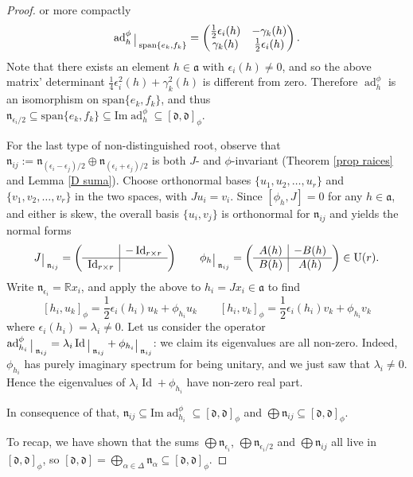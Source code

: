 \documentclass[12pt, twoside]{amsart}
\def\d{\mathfrak{d}}
\def\n{\mathfrak{n}}
\def\a{\mathfrak{a}}
\def\ad{\operatorname{ad}}
\DeclareMathOperator{\Id}{\operatorname{Id}}
\DeclareMathOperator{\U}{\operatorname{U}}
\newcommand{\restr}{\raisebox{-.2em}{$\!\big\arrowvert$}}
\theoremstyle{definition}
\begin{document}
\begin{proof}
or more compactly 
\begin{equation*}
    \ad^{\phi}_{h}\restr_{\text{span}\{e_k, f_k\}}= \begin{pmatrix}
        \frac{1}{2}\epsilon_{i}(h) & -\gamma_{k}(h) \\
        \gamma_{k}(h) & \frac{1}{2}\epsilon_{i}(h)
    \end{pmatrix}.
\end{equation*}
Note that there exists an element $h \in \a$ with $\epsilon_{i}(h) \neq 0$, and so the above matrix' determinant $\frac{1}{4}\epsilon_{i}^{2}(h)+\gamma_{k}^{2}(h)$ is different from zero. 
Therefore $\ad_{h}^{\phi}$ is an  isomorphism on $ \text{span} \{e_k, f_k\}$,  and thus $\n_{\epsilon_{i}/2}\subseteq \text{span}\{e_k, f_k\} \subseteq \text{Im} \ad_{h}^{\phi} \subseteq [\d, \d]_{\phi}$. \par
\quad For the last type of non-distinguished root, observe that $\n_{ij}:=\n_{(\epsilon_{i}-\epsilon_{j})/2}\oplus \n_{(\epsilon_{i}+\epsilon_{j})/2}$ is both $J$- and $\phi$-invariant (Theorem \ref{prop raices} and Lemma  \ref{D suma}). Choose orthonormal bases 
 $\{ u_1, u_2, \ldots,  u_r\}$ and $\{v_1,v_2,\ldots, v_r\}$ in the two spaces, with $Ju_i=v_i$. Since $[\phi_h, J]=0$ for any $h\in \a$, and either is skew, the overall basis  $\{u_i, v_j \}$ is orthonormal for $\n_{ij}$ and yields the normal forms
\begin{equation*}
J\restr_{\n_{ij}}=
\left(\begin{array}{c|c}
      & -\operatorname{Id}_{r\times r}\\ \hline
     \operatorname{Id}_{r \times r}&  
\end{array} \right)
\qquad 
\phi_h \restr_{\n_{ij}}=
\left( \begin{array}{c|c}
      A(h)& -B(h)\\ \hline
    B(h) &  A(h)
\end{array} \right)\in\U(r).
\end{equation*}
Write $\n_{\epsilon_i}=\mathbb{R}x_i$, and apply the above to $h_i=Jx_i\in\a$ to find
$$
    [h_i, u_k]_{\phi}=\frac{1}{2}\epsilon_{i}(h_i)u_k+\phi_{h_i} u_k\qquad 
    [h_i, v_k]_{\phi}=\frac{1}{2}\epsilon_{i}(h_i)v_k+ \phi_{h_i} v_k
$$
where $\epsilon_{i}(h_i)=\lambda_{i}\neq 0$. 
Let us consider the operator $\ad^{\phi}_{h_i}\restr_{\n_{ij}}= \lambda_{i}\Id\restr_{\n_{ij}} + \phi_{h_i}\restr_{\n_{ij}}$: we claim its eigenvalues are all non-zero. Indeed, $\phi_{h_i}$ has purely imaginary spectrum for being unitary, and we just saw that $\lambda_i\neq 0$. Hence the eigenvalues of $\lambda_i \Id+\phi_{h_i}$ have non-zero real part. \par
In consequence of that, 
$\n_{ij} \subseteq \text{Im} \ad^{\phi}_{h_i}\subseteq [\d, \d]_{\phi}$ and  $\bigoplus \n_{ij} \subseteq [\d,\d]_{\phi}$. \par
To recap, we have shown that the sums 
${\textstyle\bigoplus}\n_{\epsilon_i}$, $
{\textstyle\bigoplus} \n_{\epsilon_i/2}$ and ${\textstyle\bigoplus} \n_{ij}$  all live in $[\d ,\d]_{\phi}$, 
so $[\d,\d]= \bigoplus_{\alpha \in \Delta} \n_{\alpha} \subseteq [\d, \d]_{\phi}$.
\end{proof}
\end{document}
